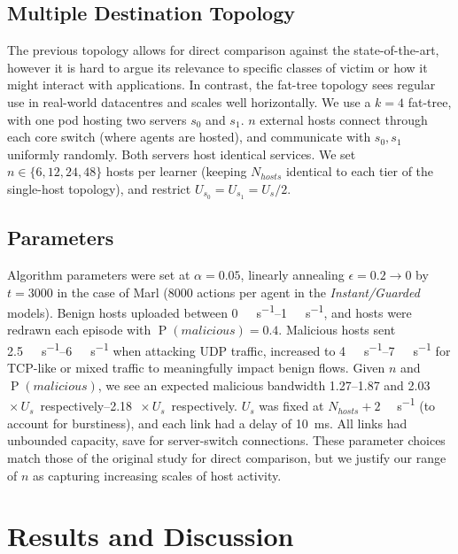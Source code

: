 \documentclass[10pt, times, conference, letterpaper]{IEEEtran}
\begin{document}
\subsection{Multiple Destination Topology}
The previous topology allows for direct comparison against the state-of-the-art, however it is hard to argue its relevance to specific classes of victim or how it might interact with applications.
In contrast, the fat-tree topology \cite{DBLP:conf/sigcomm/Al-FaresLV08} sees regular use in real-world datacentres and scales well horizontally.
We use a $k=4$ fat-tree, with one pod hosting two servers $s_0$ and $s_1$.
$n$ external hosts connect through each core switch (where agents are hosted), and communicate with $s_0, s_1$ uniformly randomly.
Both servers host identical services.
We set $n \in \{6, 12, 24, 48\}$ hosts per learner (keeping $N_{\mathit{hosts}}$ identical to each tier of the single-host topology), and restrict $U_{s_0} = U_{s_1} = U_s / 2$.

\subsection{Parameters}
Algorithm parameters were set at $\alpha=0.05$, linearly annealing $\epsilon=0.2 \rightarrow 0$ by $t=3000$ in the case of Marl (\num{8000} actions per agent in the \emph{Instant/Guarded} models).
Benign hosts uploaded between \SIrange{0}{1}{\mega\bit\per\second}, and hosts were redrawn each episode with $\operatorname{P}(\mathit{malicious})=0.4$.
Malicious hosts sent \SIrange{2.5}{6}{\mega\bit\per\second} when attacking UDP traffic, increased to \SIrange{4}{7}{\mega\bit\per\second} for TCP-like or mixed traffic to meaningfully impact benign flows.
Given $n$ and $\operatorname{P}(\mathit{malicious})$, we see an expected malicious bandwidth \numrange{1.27}{1.87} and \SIrange{2.03}{2.18}{$\! \times U_s$} respectively.
$U_s$ was fixed at $N_{\mathit{hosts}}+2$ \si{\mega\bit\per\second} (to account for burstiness), and each link had a delay of \SI{10}{\milli\second}.
All links had unbounded capacity, save for server-switch connections.
These parameter choices match those of the original study for direct comparison, but we justify our range of $n$ as capturing increasing scales of host activity.

\section{Results and Discussion}
\label{sec:the-results-of-doing-so}
\end{document}
